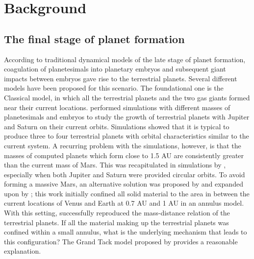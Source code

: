 \documentclass{aa}
\begin{document}
\section{Background}
\subsection{The final stage of planet formation}
\label{subsec:final_form}
According to traditional dynamical models of the late stage of planet formation, coagulation of planetesimals into planetary embryos and subsequent giant impacts between embryos gave rise to the terrestrial planets. Several different models have been proposed for this scenario. The foundational one is the Classical model, in which all the terrestrial planets and the two gas giants formed near their current locations. \cite{chambers2001making} performed simulations with different masses of planetesimals and embryos to study the growth of terrestrial planets with Jupiter and Saturn on their current orbits. Simulations showed that it is typical to produce three to four terrestrial planets with orbital characteristics similar to the current system. A recurring problem with the simulations, however, is that the masses of computed planets which form close to 1.5 AU are consistently greater than the current mass of Mars. This was recapitulated in simulations by \cite{raymond2009building}, especially when both Jupiter and Saturn were provided circular orbits. To avoid forming a massive Mars, an alternative solution was proposed by \cite{agnor1999character} and expanded upon by \cite{hansen2009formation}; this work initially confined all solid material to the area in between the current locations of Venus and Earth at 0.7 AU and 1 AU in an annulus model. With this setting, \cite{hansen2009formation} successfully reproduced the mass-distance relation of the terrestrial planets. If all the material making up the terrestrial planets was confined within a small annulus, what is the underlying mechanism that leads to this configuration? The Grand Tack model proposed by \cite{walsh2011low} provides a reasonable explanation.
\end{document}
